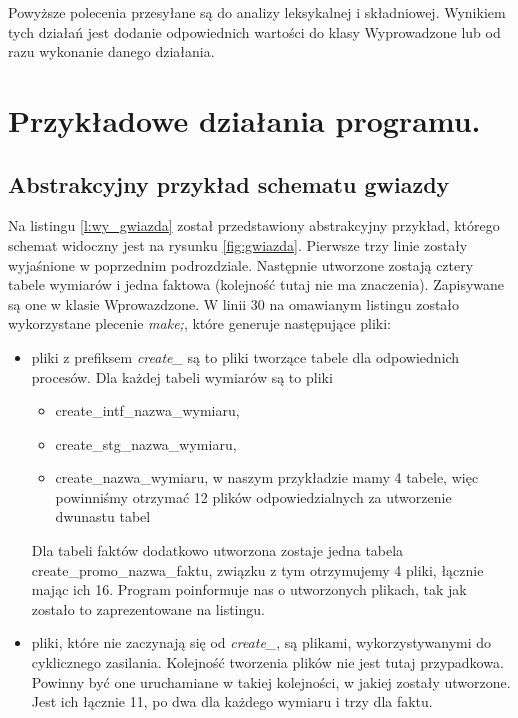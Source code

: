 Powyższe polecenia przesyłane są do analizy leksykalnej i składniowej. 
Wynikiem tych działań jest dodanie odpowiednich wartości do klasy Wyprowadzone lub od razu wykonanie danego działania.

 
\section{Przykładowe działania programu.}  \label{p_r_przyklady}

\subsection{Abstrakcyjny przykład schematu gwiazdy}
Na listingu \ref{l:wy_gwiazda} został przedstawiony abstrakcyjny przykład,
 którego schemat widoczny jest na rysunku \ref{fig:gwiazda}.
Pierwsze trzy linie zostały wyjaśnione w poprzednim podrozdziale.
Następnie utworzone zostają cztery tabele wymiarów i jedna faktowa (kolejność tutaj nie ma znaczenia). 
Zapisywane są one w klasie Wprowazdzone.
W linii 30 na omawianym listingu zostało wykorzystane plecenie \textit{make;},
 które generuje następujące pliki:
 
  \begin{itemize}
   \item 
      pliki z prefiksem \textit{create\_} są to pliki tworzące tabele dla odpowiednich procesów.
      Dla każdej tabeli wymiarów są to pliki 
        \begin{itemize}
         \item  create\_intf\_nazwa\_wymiaru,
         \item  create\_stg\_nazwa\_wymiaru,
         \item  create\_nazwa\_wymiaru,
            w naszym przykładzie mamy 4 tabele, więc powinniśmy otrzymać 12 plików 
            odpowiedzialnych za utworzenie dwunastu tabel
        \end{itemize}
      Dla tabeli faktów dodatkowo utworzona zostaje  jedna tabela create\_promo\_nazwa\_faktu,
      związku z tym otrzymujemy 4 pliki,
      łącznie mając ich 16. Program poinformuje nas o utworzonych plikach,
      tak jak zostało to zaprezentowane na listingu.
   \item 
      pliki, które nie zaczynają się od \textit{create\_},
      są plikami, wykorzystywanymi do cyklicznego zasilania.
     Kolejność tworzenia plików nie jest tutaj przypadkowa.
     Powinny być one uruchamiane w takiej kolejności, w jakiej zostały utworzone.
     Jest ich łącznie 11, po dwa dla każdego wymiaru i trzy dla faktu.
  \end{itemize}


